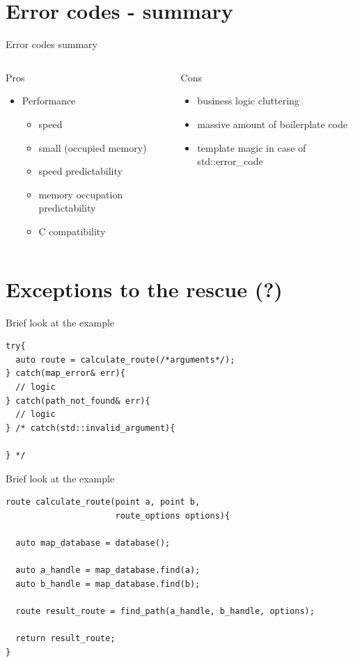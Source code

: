 \documentclass[10pt]{beamer}
\begin{document}
	
\section{Error codes - summary}

\begin{frame}{Error codes summary}
	\begin{columns}[T]
		\begin{column}{0.48\linewidth}
			Pros 
			\vfill
			\begin{itemize}
				\item Performance
				\begin{itemize}
					\item speed
					\item small (occupied memory)
					\item speed predictability
					\item memory occupation predictability
					\item C compatibility
				\end{itemize}
			\end{itemize}
		\end{column}
		\begin{column}{0.48\linewidth}
			Cons
			\vfill
			\begin{itemize}
				\item business logic cluttering
				\item massive amount of boilerplate code
				\item template magic in case of std::error\_code
			\end{itemize}
		\end{column}
	\end{columns}
\end{frame}


\section{Exceptions to the rescue (?)}

\begin{frame}[fragile]{Brief look at the example}
	\begin{verbatim}
try{
  auto route = calculate_route(/*arguments*/);
} catch(map_error& err){
  // logic
} catch(path_not_found& err){
  // logic
} /* catch(std::invalid_argument){

} */
	\end{verbatim}
\end{frame}

\begin{frame}[fragile]{Brief look at the example}
	\begin{verbatim}
route calculate_route(point a, point b,
                      route_options options){
                      
  auto map_database = database();

  auto a_handle = map_database.find(a);
  auto b_handle = map_database.find(b);

  route result_route = find_path(a_handle, b_handle, options);

  return result_route;
}
	\end{verbatim}
\end{frame}
\end{document}

